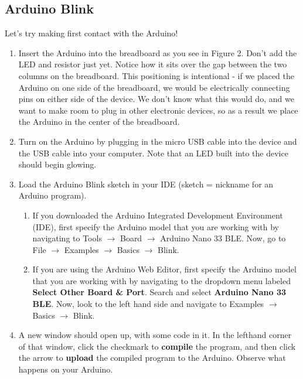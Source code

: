 \documentclass[12pt]{article}
\begin{document}
    \subsection*{Arduino Blink}
    Let’s try making first contact with the Arduino!
    \begin{enumerate}
	
	\item Insert the Arduino into the breadboard as you see in Figure 2. Don't add the LED and resistor just yet. Notice how it sits over the gap between the two columns on the breadboard. This positioning is intentional - if we placed the Arduino on one side of the breadboard, we would be electrically connecting pins on either side of the device. We don't know what this would do, and we want to make room to plug in other electronic devices, so as a result we place the Arduino in the center of the breadboard.
		    
	\item Turn on the Arduino by plugging in the micro USB cable into the device and the USB cable into your computer. Note that an LED built into the device should begin glowing. 
		    
    \item Load the Arduino Blink sketch in your IDE (sketch = nickname for an Arduino program).
    \begin{enumerate}
    	\item If you downloaded the Arduino Integrated Development Environment (IDE), first specify the Arduino model that you are working with by navigating to Tools $\rightarrow$ Board $\rightarrow$ Arduino Nano 33 BLE. Now, go to File $\rightarrow$ Examples $\rightarrow$ Basics $\rightarrow$ Blink.
        		    
        \item If you are using the Arduino Web Editor, first specify the Arduino model that you are working with by navigating to the dropdown menu labeled \textbf{Select Other Board \& Port}. Search and select \textbf{Arduino Nano 33 BLE}. Now, look to the left hand side and navigate to Examples $\rightarrow$ Basics $\rightarrow$ Blink.
    \end{enumerate}
    	        
    \item A new window should open up, with some code in it. In the lefthand corner of that window, click the checkmark to \textbf{compile} the program, and then click the arrow to \textbf{upload} the compiled program to the Arduino. Observe what happens on your Arduino.
    	 

\end{enumerate}
\end{document}
